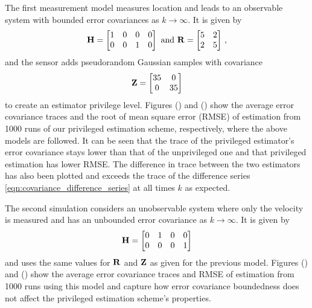 \documentclass[letterpaper, 10 pt, conference]{IEEEtran}
\theoremstyle{definition}
\begin{document}
The first measurement model measures location and leads to an observable system with bounded error covariances as $k \rightarrow \infty$. It is given by
\begin{equation*}\label{eqn:bounded_sim_measurement_model}
   \mat{H}=
   \begin{bmatrix}
      1 & 0 & 0 & 0\\
      0 & 0 & 1 & 0
   \end{bmatrix}
   \text{ and }
   \mat{R}=
   \begin{bmatrix}
      5 & 2\\
      2 & 5
   \end{bmatrix}\,,
\end{equation*}
and the sensor adds pseudorandom Gaussian samples with covariance
\begin{equation*}
   {\ensuremath{{\mathbf{Z}}}}=
   \begin{bmatrix}
      35 & 0\\
      0 & 35
   \end{bmatrix}
\end{equation*}
to create an estimator privilege level. Figures () and () show the average error covariance traces and the root of mean square error (RMSE) of estimation from 1000 runs of our privileged estimation scheme, respectively, where the above models are followed. It can be seen that the trace of the privileged estimator's error covariance stays lower than that of the unprivileged one and that privileged estimation has lower RMSE. The difference in trace between the two estimators has also been plotted and exceeds the trace of the difference series \eqref{eqn:covariance_difference_series} at all times $k$ as expected.


The second simulation considers an unobservable system where only the velocity is measured and has an unbounded error covariance as $k \rightarrow \infty$. It is given by
\begin{equation*}
   {\ensuremath{{\mathbf{H}}}}=
   \begin{bmatrix}
      0 & 1 & 0 & 0\\
      0 & 0 & 0 & 1
   \end{bmatrix}
\end{equation*}
and uses the same values for ${{\mathbf{R}}}$ and ${{\mathbf{Z}}}$ as given for the previous model. Figures () and () show the average error covariance traces and RMSE of estimation from 1000 runs using this model and capture how error covariance boundedness does not affect the privileged estimation scheme's properties.
\end{document}
